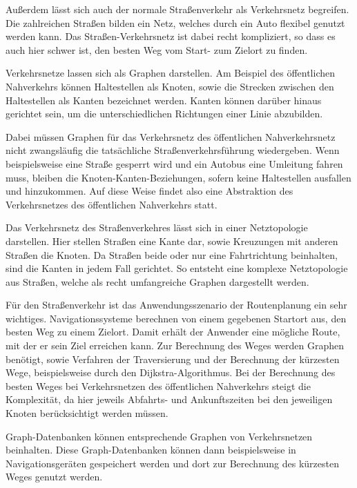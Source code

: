 Außerdem lässt sich auch der normale Straßenverkehr als Verkehrsnetz begreifen. Die zahlreichen Straßen bilden ein Netz, welches durch ein Auto flexibel genutzt werden kann. Das Straßen-Verkehrsnetz ist dabei recht kompliziert, so dass es auch hier schwer ist, den besten Weg vom Start- zum Zielort zu finden.

Verkehrsnetze lassen sich als Graphen darstellen. Am Beispiel des öffentlichen Nahverkehrs können Haltestellen als Knoten, sowie die Strecken zwischen den Haltestellen als Kanten bezeichnet werden. Kanten können darüber hinaus gerichtet sein, um die unterschiedlichen Richtungen einer Linie abzubilden. \cite[p.~74 ff.]{bartelme01}

Dabei müssen Graphen für das Verkehrsnetz des öffentlichen Nahverkehrsnetz nicht zwangsläufig die tatsächliche Straßenverkehrsführung wiedergeben. Wenn beispielsweise eine Straße gesperrt wird und ein Autobus eine Umleitung fahren muss, bleiben die Knoten-Kanten-Beziehungen, sofern keine Haltestellen ausfallen und hinzukommen. Auf diese Weise findet also eine Abstraktion des Verkehrsnetzes des öffentlichen Nahverkehrs statt.  \cite[p.~74 ff.]{bartelme01}

Das Verkehrsnetz des Straßenverkehres lässt sich in einer Netztopologie darstellen. Hier stellen Straßen eine Kante dar, sowie Kreuzungen mit anderen Straßen die Knoten. Da Straßen beide oder nur eine Fahrtrichtung beinhalten, sind die Kanten in jedem Fall gerichtet. So entsteht eine komplexe Netztopologie aus Straßen, welche als recht umfangreiche Graphen dargestellt werden. \cite[p.~122]{bartelme01}

Für den Straßenverkehr ist das Anwendungsszenario der Routenplanung ein sehr wichtiges. Navigationssysteme berechnen von einem gegebenen Startort aus, den besten Weg zu einem Zielort. Damit erhält der Anwender eine mögliche Route, mit der er sein Ziel erreichen kann. \cite[p.~122]{bartelme01} Zur Berechnung des Weges werden Graphen benötigt, sowie Verfahren der Traversierung und der Berechnung der kürzesten Wege, beispielsweise durch den Dijkstra-Algorithmus. Bei der Berechnung des besten Weges bei Verkehrsnetzen des öffentlichen Nahverkehrs steigt die Komplexität, da hier jeweils Abfahrts- und Ankunftszeiten bei den jeweiligen Knoten berücksichtigt werden müssen.

Graph-Datenbanken können entsprechende Graphen von Verkehrsnetzen beinhalten. Diese Graph-Datenbanken können dann beispielsweise in Navigationsgeräten gespeichert werden und dort zur Berechnung des kürzesten Weges genutzt werden.

